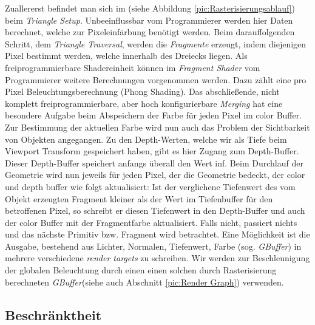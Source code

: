 \vspace*{3cm}        
Zuallererst befindet man sich im (siehe Abbildung \ref{pic:Rasterisierungsablauf}) beim \textit{Triangle Setup}. 
Unbeeinflussbar vom Programmierer werden hier Daten berechnet, welche zur Pixeleinfärbung
benötigt werden. Beim darauffolgenden Schritt, dem \textit{Triangle Traversal}, werden die \textit{Fragmente} erzeugt, indem diejenigen Pixel bestimmt werden, welche innerhalb des Dreiecks liegen. 
Als freiprogrammierbare Shadereinheit können im \textit{Fragment Shader} vom Programmierer weitere Berechnungen vorgenommen werden. Dazu zählt eine pro Pixel Beleuchtungsberechnung (Phong Shading).
Das abschließende, nicht komplett freiprogrammierbare, aber hoch konfigurierbare \textit{Merging} hat eine besondere Aufgabe beim Abspeichern der Farbe für
jeden Pixel im color Buffer. Zur Bestimmung der aktuellen Farbe wird nun auch das Problem der Sichtbarkeit von Objekten angegangen. Zu den Depth-Werten, welche wir als Tiefe beim 
Viewport Transform gespeichert haben, gibt es hier Zugang zum Depth-Buffer. Dieser Depth-Buffer speichert anfangs überall den Wert inf. Beim Durchlauf der Geometrie wird nun jeweils für jeden Pixel,
der die Geometrie bedeckt, der color und depth buffer wie folgt aktualisiert: Ist der verglichene Tiefenwert des vom Objekt erzeugten Fragment kleiner als der Wert
im Tiefenbuffer für den betroffenen Pixel, so schreibt er diesen Tiefenwert in den Depth-Buffer und auch der color Buffer mit der Fragmentfarbe aktualisiert.
Falls nicht, passiert nichts und das nächste Primitiv bzw. Fragment wird betrachtet. 
Eine Möglichkeit ist die Ausgabe, bestehend aus Lichter, Normalen, Tiefenwert, Farbe (sog. \textit{GBuffer}) in mehrere verschiedene \textit{render targets} zu schreiben. 
Wir werden zur Beschleunigung der globalen Beleuchtung durch einen  einen solchen durch Rasterisierung berechneten \textit{GBuffer}(siehe auch
Abschnitt \ref{pic:Render Graph}) verwenden.
\vfill

\subsection{Beschränktheit}
\label{sec:Rasterisierung:Beschränktheit}

